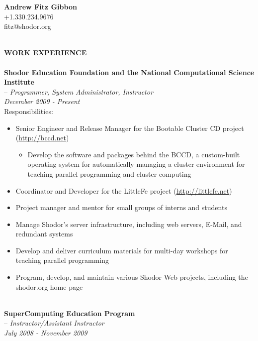 \documentclass[10pt]{article}
\begin{document}
\begin{center}
\textbf{Andrew Fitz Gibbon}~\\
+1.330.234.9676~\\
fitz@shodor.org~\\
\end{center}
~\\
\textbf{WORK EXPERIENCE}~\\
~\\
\indent\textbf{Shodor Education Foundation and the National Computational Science Institute}~\\
\indent \indent -- \emph{Programmer, System Administrator, Instructor}~\\
\indent\textit{December 2009 - Present}~\\
\indent Responsibilities:
\begin{itemize}
  \addtolength{\itemsep}{-2mm}
		\item \indent Senior Engineer and Release Manager for the Bootable Cluster CD project (\url{http://bccd.net})
		\vspace{-2mm}
		\begin{itemize}
			\addtolength{\itemsep}{-2mm}
			\item Develop the software and packages behind the BCCD, a custom-built operating system for automatically managing a cluster environment for teaching parallel programming and cluster computing
		\end{itemize}
		\vspace{-2mm}
    \item \indent Coordinator and Developer for the LittleFe project (\url{http://littlefe.net})
		\item \indent Project manager and mentor for small groups of interns and students
		\item \indent Manage Shodor's server infrastructure, including web servers, E-Mail, and redundant systems
		\item \indent Develop and deliver curriculum materials for multi-day workshops for teaching parallel programming
		\item \indent Program, develop, and maintain various Shodor Web projects, including the shodor.org home page
\end{itemize}
~\\
\indent\textbf{SuperComputing Education Program}~\\
\indent \indent -- \emph{Instructor/Assistant Instructor}~\\
\indent\textit{July 2008 - November 2009}~\\
\end{document}
